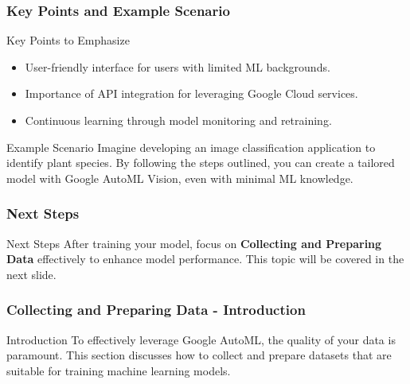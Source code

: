 \documentclass[aspectratio=169]{beamer}
\begin{document}
\begin{frame}[fragile]
    \frametitle{Key Points and Example Scenario}
    \begin{block}{Key Points to Emphasize}
        \begin{itemize}
            \item User-friendly interface for users with limited ML backgrounds.
            \item Importance of API integration for leveraging Google Cloud services.
            \item Continuous learning through model monitoring and retraining.
        \end{itemize}
    \end{block}

    \begin{block}{Example Scenario}
        Imagine developing an image classification application to identify plant species. 
        By following the steps outlined, you can create a tailored model with Google AutoML Vision, even with minimal ML knowledge.
    \end{block}
\end{frame}

\begin{frame}[fragile]
    \frametitle{Next Steps}
    \begin{block}{Next Steps}
        After training your model, focus on \textbf{Collecting and Preparing Data} effectively 
        to enhance model performance. This topic will be covered in the next slide.
    \end{block}
\end{frame}

\begin{frame}[fragile]
    \frametitle{Collecting and Preparing Data - Introduction}
    \begin{block}{Introduction}
        To effectively leverage Google AutoML, the quality of your data is paramount. This section discusses how to collect and prepare datasets that are suitable for training machine learning models.
    \end{block}
\end{frame}
\end{document}
